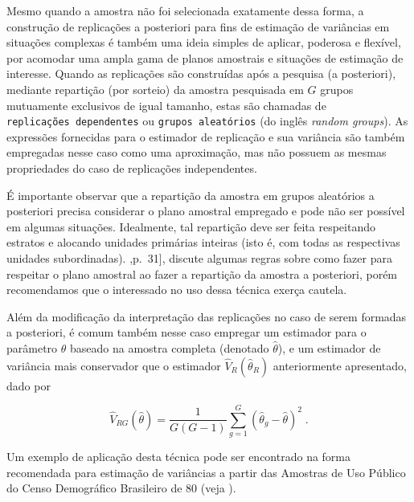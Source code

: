 \documentclass[]{book}
\theoremstyle{definition}
\theoremstyle{definition}
\theoremstyle{definition}
\theoremstyle{remark}
\begin{document}
Mesmo quando a amostra não foi selecionada exatamente dessa forma, a
construção de replicações a posteriori para fins de estimação de
variâncias em situações complexas é também uma ideia simples de aplicar,
poderosa e flexível, por acomodar uma ampla gama de planos amostrais e
situações de estimação de interesse. Quando as replicações são
construídas após a pesquisa (a posteriori), mediante repartição (por
sorteio) da amostra pesquisada em \(G\) grupos mutuamente exclusivos de
igual tamanho, estas são chamadas de \texttt{replicações\ dependentes}
ou \texttt{grupos\ aleatórios} (do inglês \emph{random groups}). As
expressões fornecidas para o estimador de replicação e sua variância são
também empregadas nesse caso como uma aproximação, mas não possuem as
mesmas propriedades do caso de replicações independentes.

É importante observar que a repartição da amostra em grupos aleatórios a
posteriori precisa considerar o plano amostral empregado e pode não ser
possível em algumas situações. Idealmente, tal repartição deve ser feita
respeitando estratos e alocando unidades primárias inteiras (isto é, com
todas as respectivas unidades subordinadas). \citep{W85},p.~31{]},
discute algumas regras sobre como fazer para respeitar o plano amostral
ao fazer a repartição da amostra a posteriori, porém recomendamos que o
interessado no uso dessa técnica exerça cautela.

Além da modificação da interpretação das replicações no caso de serem
formadas a posteriori, é comum também nesse caso empregar um estimador
para o parâmetro \(\theta\) baseado na amostra completa (denotado
\(\widehat{\theta }\)), e um estimador de variância mais conservador que
o estimador \(\widehat{V}_{R}\left( \widehat{\theta }_{R}\right)\)
anteriormente apresentado, dado por

\begin{equation}
\widehat{V}_{RG}\left( \widehat{\theta }\right) =\frac{1}{G\left( G-1\right) 
}\sum_{g=1}^{G}\left( \widehat{\theta }_{g}-\widehat{\theta }\right) ^{2}\;.
\label{eq:estpa25}
\end{equation}

Um exemplo de aplicação desta técnica pode ser encontrado na forma
recomendada para estimação de variâncias a partir das Amostras de Uso
Público do Censo Demográfico Brasileiro de 80 (veja \citep{IBGE85}).
\end{document}
